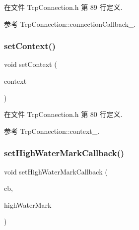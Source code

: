 在文件 Tcp\+Connection.\+h 第 89 行定义.



参考 Tcp\+Connection\+::connection\+Callback\+\_\+.

\mbox{\label{classmuduo_1_1net_1_1TcpConnection_a332ba7a521a446572051bc6939f4c4fa}} 
\subsubsection{\texorpdfstring{set\+Context()}{setContext()}}
{\footnotesize\ttfamily void set\+Context (\begin{DoxyParamCaption}\item[{const boost\+::any \&}]{context }\end{DoxyParamCaption})\hspace{0.3cm}{\ttfamily [inline]}}



在文件 Tcp\+Connection.\+h 第 80 行定义.



参考 Tcp\+Connection\+::context\+\_\+.

\mbox{\label{classmuduo_1_1net_1_1TcpConnection_ad44c03a6a6e2c20c87f2b8d296d42d2b}} 
\subsubsection{\texorpdfstring{set\+High\+Water\+Mark\+Callback()}{setHighWaterMarkCallback()}}
{\footnotesize\ttfamily void set\+High\+Water\+Mark\+Callback (\begin{DoxyParamCaption}\item[{const \hyperlink{namespacemuduo_1_1net_a503c5e91d2e84874e83e9a6cbfb4a47b}{High\+Water\+Mark\+Callback} \&}]{cb,  }\item[{size\+\_\+t}]{high\+Water\+Mark }\end{DoxyParamCaption})\hspace{0.3cm}{\ttfamily [inline]}}



